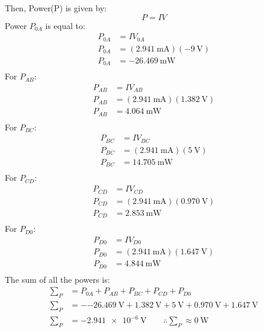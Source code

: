 \documentclass[a4paper]{article}
\begin{document}
Then, Power(P) is given by:
\[P=IV\]
Power $P_{0A}$ is equal to:
\begin{align*}
    P_{0A}&=IV_{0A}\\
    P_{0A}&=(\SI{2.941}{\milli\ampere})(\SI{-9}{\volt})\\
    P_{0A}&=\SI{-26.469}{\milli\watt}\\
\end{align*}
For $P_{AB}$:
\begin{align*}
    P_{AB}&=IV_{AB}\\
    P_{AB}&=(\SI{2.941}{\milli\ampere})(\SI{1.382}{\volt})\\
    P_{AB}&=\SI{4.064}{\milli\watt}\\
\end{align*}
For $P_{BC}$:
\begin{align*}
    P_{BC}&=IV_{BC}\\
    P_{BC}&=(\SI{2.941}{\milli\ampere})(\SI{5}{\volt})\\
    P_{BC}&=\SI{14.705}{\milli\watt}\\
\end{align*}
For $P_{CD}$:
\begin{align*}
    P_{CD}&=IV_{CD}\\
    P_{CD}&=(\SI{2.941}{\milli\ampere})(\SI{0.970}{\volt})\\
    P_{CD}&=\SI{2.853}{\milli\watt}\\
\end{align*}
For $P_{D0}$:
\begin{align*}
    P_{D0}&=IV_{D0}\\
    P_{D0}&=(\SI{2.941}{\milli\ampere})(\SI{1.647}{\volt})\\
    P_{D0}&=\SI{4.844}{\milli\watt}\\
\end{align*}
The sum of all the powers is:
\begin{align*}
    \sum\nolimits_{P}&=P_{0A}+P_{AB}+P_{BC}+P_{CD}+P_{D0}\\
    \sum\nolimits_{P}&=-\SI{-26.469}{\volt}+\SI{1.382}{\volt}+\SI{5}{\volt}+\SI{0.970}{\volt}+\SI{1.647}{\volt}\\
    \sum\nolimits_{P}&=\SI{-2.941e-6}{\volt}\qquad
    \therefore\sum\nolimits_{P}\approx \SI{0}{\watt}
\end{align*}
\end{document}
